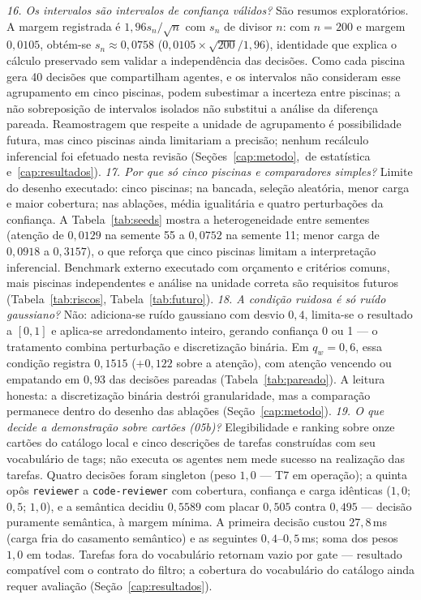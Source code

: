 \textit{16. Os intervalos são intervalos de confiança válidos?} São resumos exploratórios. A margem registrada é $1{,}96s_n/\sqrt{n}$ com $s_n$ de divisor $n$: com $n=200$ e margem $0{,}0105$, obtém-se $s_n\approx0{,}0758$ ($0{,}0105\times\sqrt{200}/1{,}96$), identidade que explica o cálculo preservado sem validar a independência das decisões. Como cada piscina gera 40 decisões que compartilham agentes, e os intervalos não consideram esse agrupamento em cinco piscinas, podem subestimar a incerteza entre piscinas; a não sobreposição de intervalos isolados não substitui a análise da diferença pareada. Reamostragem que respeite a unidade de agrupamento é possibilidade futura, mas cinco piscinas ainda limitariam a precisão; nenhum recálculo inferencial foi efetuado nesta revisão (Seções~\ref{cap:metodo},~de estatística e~\ref{cap:resultados}).
\textit{17. Por que só cinco piscinas e comparadores simples?} Limite do desenho executado: cinco piscinas; na bancada, seleção aleatória, menor carga e maior cobertura; nas ablações, média igualitária e quatro perturbações da confiança. A Tabela~\ref{tab:seeds} mostra a heterogeneidade entre sementes (atenção de $0{,}0129$ na semente 55 a $0{,}0752$ na semente 11; menor carga de $0{,}0918$ a $0{,}3157$), o que reforça que cinco piscinas limitam a interpretação inferencial. Benchmark externo executado com orçamento e critérios comuns, mais piscinas independentes e análise na unidade correta são requisitos futuros (Tabela~\ref{tab:riscos}, Tabela~\ref{tab:futuro}).
\textit{18. A condição ruidosa é só ruído gaussiano?} Não: adiciona-se ruído gaussiano com desvio $0{,}4$, limita-se o resultado a $[0,1]$ e aplica-se arredondamento inteiro, gerando confiança 0 ou 1 --- o tratamento combina perturbação e discretização binária. Em $q_w=0{,}6$, essa condição registra $0{,}1515$ ($+0{,}122$ sobre a atenção), com atenção vencendo ou empatando em $0{,}93$ das decisões pareadas (Tabela~\ref{tab:pareado}). A leitura honesta: a discretização binária destrói granularidade, mas a comparação permanece dentro do desenho das ablações (Seção~\ref{cap:metodo}).
\textit{19. O que decide a demonstração sobre cartões (05b)?} Elegibilidade e ranking sobre onze cartões do catálogo local e cinco descrições de tarefas construídas com seu vocabulário de tags; não executa os agentes nem mede sucesso na realização das tarefas. Quatro decisões foram singleton (peso $1{,}0$ --- T7 em operação); a quinta opôs \texttt{reviewer} a \texttt{code-reviewer} com cobertura, confiança e carga idênticas ($1{,}0$; $0{,}5$; $1{,}0$), e a semântica decidiu $0{,}5589$ com placar $0{,}505$ contra $0{,}495$ --- decisão puramente semântica, à margem mínima. A primeira decisão custou $27{,}8$\,ms (carga fria do casamento semântico) e as seguintes $0{,}4$--$0{,}5$\,ms; soma dos pesos $1{,}0$ em todas. Tarefas fora do vocabulário retornam vazio por gate --- resultado compatível com o contrato do filtro; a cobertura do vocabulário do catálogo ainda requer avaliação (Seção~\ref{cap:resultados}).

